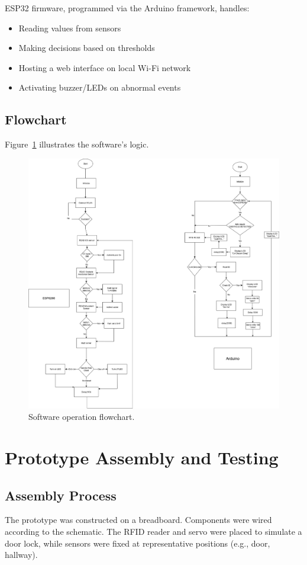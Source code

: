 \documentclass[conference, onecolumn]{IEEEtran}
\begin{document}
ESP32 firmware, programmed via the Arduino framework, handles:
\begin{itemize}
    \item Reading values from sensors
    \item Making decisions based on thresholds
    \item Hosting a web interface on local Wi-Fi network
    \item Activating buzzer/LEDs on abnormal events
\end{itemize}

\subsection{Flowchart}
Figure~\ref{fig:flowchart} illustrates the software's logic.

\begin{figure}[H]
\centering
\includegraphics[width=0.95\linewidth]{Flowchart.drawio.png}
\caption{Software operation flowchart.}
\label{fig:flowchart}
\end{figure}

\section{Prototype Assembly and Testing}
\subsection{Assembly Process}
The prototype was constructed on a breadboard. Components were wired according to the schematic. The RFID reader and servo were placed to simulate a door lock, while sensors were fixed at representative positions (e.g., door, hallway).
\end{document}
